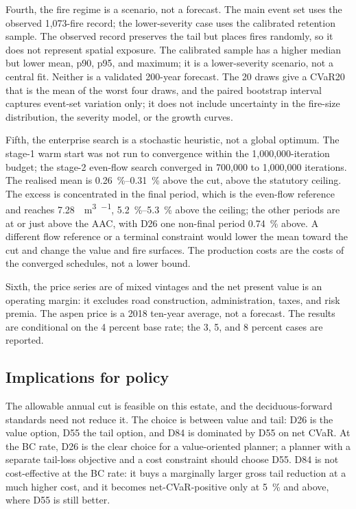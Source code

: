 Fourth, the fire regime is a scenario, not a forecast. The main event set uses the observed
1,073-fire record; the lower-severity case uses the calibrated retention sample. The observed record
preserves the tail but places fires randomly, so it does not represent spatial exposure. The
calibrated sample has a higher median but lower mean, p90, p95, and maximum; it is a
lower-severity scenario, not a central fit. Neither is a validated 200-year forecast. The 20 draws give a CVaR20 that is the mean of the worst
four draws, and the paired bootstrap interval captures event-set variation only; it does not include
uncertainty in the fire-size distribution, the severity model, or the growth curves.

Fifth, the enterprise search is a stochastic heuristic, not a global optimum. The stage-1
warm start was not run to convergence within the 1,000,000-iteration budget; the stage-2 even-flow
search converged in 700,000 to 1,000,000 iterations. The realised mean is
\SIrange{0.26}{0.31}{\percent} above the cut, above the statutory ceiling. The excess is
concentrated in the final period, which is the even-flow reference and reaches
\SI{7.28}{\mega\cubic\meter\per\year}, \SIrange{5.2}{5.3}{\percent} above the ceiling; the
other periods are at or just above the AAC, with D26 one non-final period \SI{0.74}{\percent}
above. A different flow reference or a terminal constraint would lower the mean
toward the cut and change the value and fire surfaces. The production costs are the costs of the
converged schedules, not a lower bound.

Sixth, the price series are of mixed vintages and the net present value is an operating margin: it
excludes road construction, administration, taxes, and risk premia. The aspen price is a 2018
ten-year average, not a forecast. The results are conditional on the 4 percent base rate; the 3, 5,
and 8 percent cases are reported.

\subsection{Implications for policy}

The allowable annual cut is feasible on this estate, and the deciduous-forward standards need not
reduce it. The choice is between value and tail: D26 is the value option, D55 the tail option, and
D84 is dominated by D55 on net CVaR. At the BC rate, D26 is the clear choice for a value-oriented
planner; a planner with a separate tail-loss objective and a cost constraint should choose D55. D84
is not cost-effective at the BC rate: it buys a marginally larger gross tail reduction at a much
higher cost, and it becomes net-CVaR-positive only at \SI{5}{\percent} and above, where D55 is still
better.


